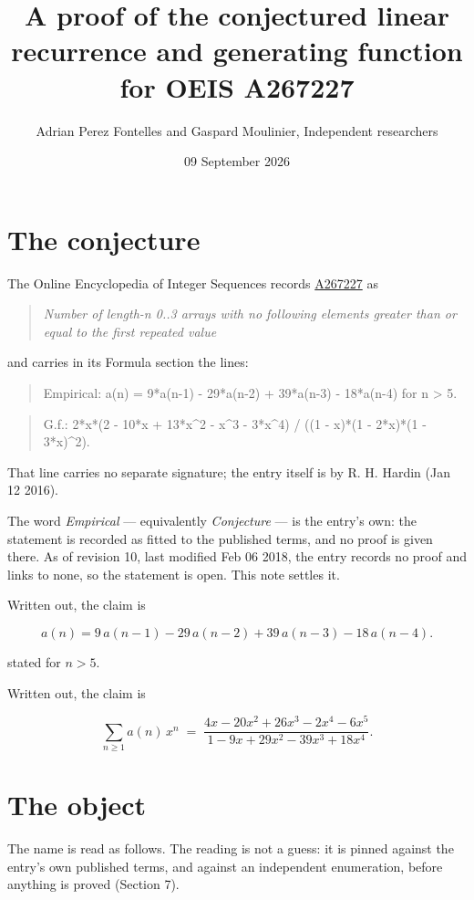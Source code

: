 \documentclass[11pt]{article}
\title{A proof of the conjectured linear recurrence and generating function for OEIS A267227}
\author{Adrian Perez Fontelles and Gaspard Moulinier, Independent researchers}
\date{09 September 2026}
\theoremstyle{definition}
\begin{document}
\maketitle
\section{The conjecture}

The Online Encyclopedia of Integer Sequences records \href{https://oeis.org/A267227}{A267227} as

\begin{quote}\itshape Number of length-n 0..3 arrays with no following elements greater than or equal to the first repeated value\end{quote}

and carries in its Formula section the lines:

\begin{quote}\ttfamily Empirical: a(n) = 9*a(n-1) - 29*a(n-2) + 39*a(n-3) - 18*a(n-4) for n > 5.\end{quote}

\begin{quote}\ttfamily G.f.: 2*x*(2 - 10*x + 13*x\textasciicircum{}2 - x\textasciicircum{}3 - 3*x\textasciicircum{}4) / ((1 - x)*(1 - 2*x)*(1 - 3*x)\textasciicircum{}2).\end{quote}

That line carries no separate signature; the entry itself is by R. H. Hardin (Jan 12 2016).

The word {\itshape Empirical} --- equivalently {\itshape Conjecture} --- is the entry's own: the statement is recorded as fitted to the published terms, and no proof is given there. As of revision 10, last modified Feb 06 2018, the entry records no proof and links to none, so the statement is open. This note settles it.

Written out, the claim is

\[a(n) = 9\,a(n-1) - 29\,a(n-2) + 39\,a(n-3) - 18\,a(n-4).\]

stated for $n > 5$.

Written out, the claim is

\[\sum_{n \ge 1} a(n)\,x^n \;=\; \frac{4x - 20x^{2} + 26x^{3} - 2x^{4} - 6x^{5}}{1 - 9x + 29x^{2} - 39x^{3} + 18x^{4}}.\]

\section{The object}

The name is read as follows. The reading is not a guess: it is pinned against the entry's own published terms, and against an independent enumeration, before anything is proved (Section 7).
\end{document}
